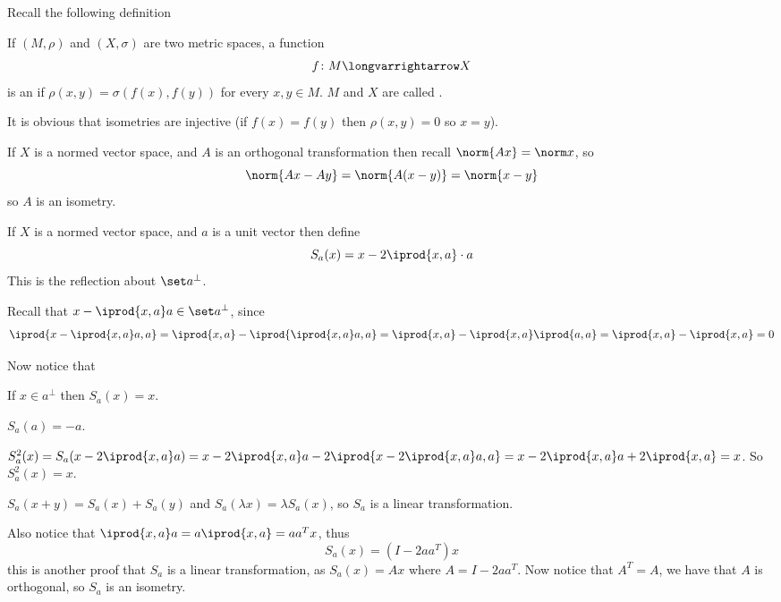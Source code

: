 \documentclass[10pt]{article}
\let\longto=\longvarrightarrow
\begin{document}


\bigskip

Recall the following definition

\begin{defn*}

    If $(M,\rho)$ and $(X,\sigma)$ are two metric spaces, a function
    \[ f\colon M\longto X \]
    is an  if $\rho(x,y)=\sigma(f(x),f(y))$ for every $x,y\in M$.
    $M$ and $X$ are called .

\end{defn*}

It is obvious that isometries are injective (if $f(x)=f(y)$ then $\rho(x,y)=0$ so $x=y$).

If $X$ is a normed vector space, and $A$ is an orthogonal transformation then recall $\norm{Ax}=\norm x$, so
\[ \norm{Ax-Ay}=\norm{A(x-y)} = \norm{x-y} \]
so $A$ is an isometry.

\begin{defn*}

    If $X$ is a normed vector space, and $a$ is a unit vector then define
    \[ S_a(x) = x - 2\iprod{x,a}\cdot a \]
    This is the reflection about $\set a^\bot$.

\end{defn*}

Recall that $x-\iprod{x,a}a\in\set a^\bot$, since
\[ \iprod{x-\iprod{x,a}a,a} = \iprod{x,a} - \iprod{\iprod{x,a}a,a} = \iprod{x,a} - \iprod{x,a}\iprod{a,a} = \iprod{x,a} - \iprod{x,a} = 0 \]

Now notice that
\blist
    \item If $x\in a^\bot$ then $S_a(x)=x$.
    \item $S_a(a)=-a$.
    \item $S_a^2(x)=S_a(x-2\iprod{x,a}a)=x-2\iprod{x,a}a-2\iprod{x-2\iprod{x,a}a,a}=x-2\iprod{x,a}a+2\iprod{x,a}=x$.
    So $S_a^2(x)=x$.
    \item $S_a(x+y)=S_a(x)+S_a(y)$ and $S_a(\lambda x)=\lambda S_a(x)$, so $S_a$ is a linear transformation.
\elist

Also notice that $\iprod{x,a}a=a\iprod{x,a}=aa^Tx$, thus
\[ S_a(x) = (I-2aa^T)x \]
this is another proof that $S_a$ is a linear transformation, as $S_a(x)=Ax$ where $A=I-2aa^T$.
Now notice that $A^T=A$, we have that $A$ is orthogonal, so $S_a$ is an isometry.
\end{document}
